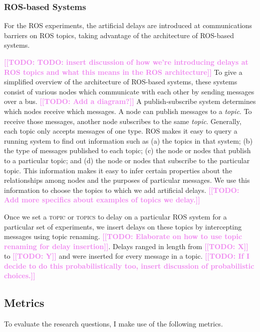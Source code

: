 \documentclass[conference]{IEEEtran}
\newcommand{\todo}[1]{\textcolor{violet}{{\bfseries [[TODO: #1]]}}}
\newcommand{\tool}[1]{\textsc{#1}}
\begin{document}
\subsubsection{\tool{ROS}-based Systems}
For the \tool{\ac{ROS}} experiments, the artificial delays are introduced at communications 
barriers on ROS topics, taking advantage of the architecture of \tool{ROS}-based systems. 


\todo{TODO: insert discussion of how we're introducing delays at ROS topics and what this means in the ROS architecture}
To give a simplified overview of the architecture of ROS-based systems,
these systems consist of various nodes which communicate with each other by 
sending messages over a bus.
\todo{Add a diagram?} 
A publish-subscribe system determines which nodes receive which messages. 
A node can publish messages to a \emph{topic}.
To receive those messages, another node subscribes to the same \emph{topic}.
Generally, each topic only accepts messages of one type.
\tool{\ac{ROS}} makes it easy to query a running system to find out information
such as (a) the topics in that system; (b) the type of messages published to each
topic; (c) the node or nodes that publish to a particular topic; and (d) the node
or nodes that subscribe to the particular topic.
This information makes it easy to infer certain properties about the relationships
among nodes and the purposes of particular messages.
We use this information to choose the topics to which we add artificial delays.
\todo{Add more specifics about examples of topics we delay.}

Once we set a \tool{topic} or \tool{topics} to delay on a particular \tool{\ac{ROS}}
system for a particular set of experiments, we insert delays on these topics by
intercepting messages using topic renaming. \todo{Elaborate on how to use topic renaming for delay insertion}. 
Delays ranged in length from \todo{X} to \todo{Y} and were inserted for every message 
in a topic. \todo{If I decide to do this probabilistically too, insert discussion of 
probabilistic choices.}

\subsection{Metrics}
\label{sec:timing-methodology-metrics}
To evaluate the research questions, I make use of the following metrics.
\end{document}
